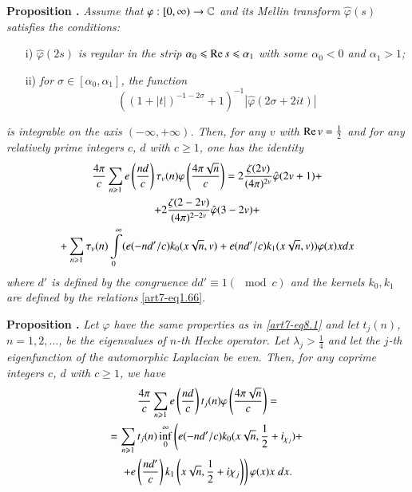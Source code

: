 \medskip
\noindent
{\bfseries Proposition .\label{art7-prop13}}
\textit{Assume that $\varphi:[0,\infty) \to \mathbb{C}$ and its Mellin transform $\hat{\varphi} (s)$ satisfies the conditions:}
\begin{itemize}
\item[i)] $\hat{\varphi}(2s)$ \textit{is regular in the strip $\alpha_0 \leqslant \operatorname{Re} s \leqslant \alpha_1$ with some $\alpha_0 <0$ and $\alpha_1 >1$;}

\item[ii)] \textit{for $\sigma \in [\alpha_0 , \alpha_1]$, the function}
$$
((1+|t|)^{-1-2\sigma} +1)^{-1} |\hat{\varphi} (2 \sigma + 2 it)|
$$
\end{itemize}
\textit{is integrable on the axis $(-\infty, + \infty)$. Then, for any $v$ with $\operatorname{Re} v = \frac{1}{2}$ and for any relatively prime integers $c$, $d$ with $c \geqslant 1$, one has the identity}
\setcounter{section}{8}
\setcounter{equation}{0}
\begin{gather}
\frac{4\pi}{c} \sum\limits_{n \geqslant 1} e \left(\frac{nd}{c} \right) \tau_v (n) \varphi \left(\frac{4\pi \sqrt{n}}{c} \right) = 2 \frac{\zeta (2v)}{(4 \pi)^{2v}} \hat{\varphi} (2v+1) + \label{art7-eq8.1}\\
+ 2 \frac{\zeta (2 - 2 v)}{(4\pi)^{2-2v}} \hat{\varphi} (3 - 2 v) + \notag\\
+ \sum\limits_{n \geqslant 1} \tau_v (n) \int\limits^\infty_0 (e (-nd'/c) k_0 (x \sqrt{n}, v) + e(nd'/ c) k_1 (x \sqrt{n}, v) ) \varphi  (x) x d x\notag
\end{gather}
\textit{where $d'$ is defined by the congruence $dd' \equiv 1 (\mod c)$ and the kernels $k_0, k_1$ are defined by the relations} \eqref{art7-eq1.66}.

\medskip
\noindent
{\bfseries Proposition .\label{art7-prop14}}
\textit{Let $\varphi$ have the same properties as in \eqref{art7-eq8.1} and let $t_j(n)$, $n = 1, 2, \ldots$, be the eigenvalues of $n$-th Hecke operator. Let $\lambda_j > \frac{1}{4}$ and let the $j$-th eigenfunction  of the automorphic Laplacian be even. Then, for any coprime integers $c$, $d$ with $c \geqslant 1$, we have}
\begin{gather}
\frac{4\pi}{c} \sum\limits_{n \geqslant 1} e \left(\frac{nd}{c} \right) t _j(n) \varphi \left(\frac{4\pi \sqrt{n}}{c} \right) = \label{art7-eq8.2}\\
= \sum\limits_{n \geqslant 1} t_j(n) \inf\limits^\infty_0 \left(e (-nd'/c) k_0 (x\sqrt{n},\frac{1}{2} + i_{\chi_j}) + \right. \notag \\
\left. + e \left(\frac{nd'}{c} \right) k_1 \left(x \sqrt{n}, \frac{1}{2} + i \chi_j \right) \right) \varphi (x)x \;d x.\notag
\end{gather}\pageoriginale 


